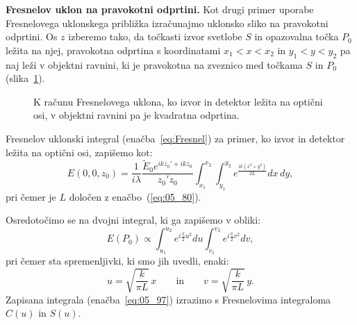 \begin{example}{\bf Fresnelov uklon na pravokotni odprtini.}
Kot drugi primer uporabe Fresnelovega uklonskega približka izračunajmo uklonsko sliko 
na pravokotni odprtini. Os $z$ izberemo tako, da točkasti izvor svetlobe $S$ in
opazovalna točka $P_0$  ležita na njej, pravokotna odprtina s
koordinatami $x_1<x<x_2$ in $y_1<y<y_2$ pa naj leži v objektni
ravnini, ki je pravokotna na zveznico med točkama $S$ in $P_0$ (slika~\ref{fig:05_FresPravokot}).
\begin{figure}[ht]
\centering
\def\svgwidth{100truemm} 

\caption{K računu Fresnelovega uklona, ko izvor in detektor ležita na optični osi, v objektni ravnini
pa je kvadratna odprtina.}
\label{fig:05_FresPravokot}
\end{figure}

Fresnelov uklonski integral (enačba~\ref{eq:Fresnel}) za primer, ko izvor in detektor ležita
na optični osi, zapišemo kot:
\begin{equation}
E(0,0, z_0) = \frac{1}{i\lambda} \frac{\tilde{E}_0 e^{ikz_0'+ikz_0}}{z_0'z_0} 
\int_{x_1}^{x_2}\!\!\!\int_{y_1}^{y_2} e^{\frac{ik(x^2+y^2)}{2L}}  dx\,dy,
\label{eq:05_96}
\end{equation}
pri čemer je $L$ določen z enačbo~(\ref{eq:05_80}).

Osredotočimo se na dvojni integral, 
ki ga zapišemo v obliki:
\begin{equation}
E(P_0) \propto \int_{u_1}^{u_2} e^{i\frac{\pi}{2}u^2} du
\int_{v_1}^{v_2} e^{i\frac{\pi}{2}v^2} dv,
\label{eq:05_97}
\end{equation}
pri čemer sta spremenljivki, ki smo jih uvedli, enaki:
\begin{equation}
u = \sqrt{\frac{k}{\pi L}}\,x \qquad \mathrm{in} \qquad v = \sqrt{\frac{k}{\pi L}}\,y.
\label{eq:05_98}
\end{equation}
Zapisana integrala (enačba~\ref{eq:05_97}) izrazimo s Fresnelovima integraloma $C(u)$ in 
$S(u)$.


\end{example}
